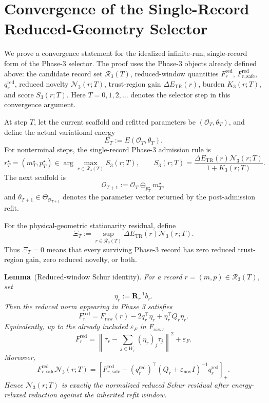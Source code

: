 \documentclass[
  reprint,
  amsmath,
  amssymb,
  aps,
  pra,
  nofootinbib,
  superscriptaddress,
  floatfix
]{revtex4-2}
\newenvironment{schurlemma}[1][]
{\par\medskip\noindent\textbf{Lemma}\if\relax\detokenize{#1}\relax\else\ (#1)\fi.\space\itshape}
{\par\medskip}
\begin{document}
\section{Convergence of the Single-Record Reduced-Geometry Selector}

We prove a convergence statement for the idealized infinite-run,
single-record form of the Phase-3 selector.  The proof uses the Phase-3
objects already defined above: the candidate record set
\(\mathcal R_3(T)\), reduced-window quantities \(F_r^{\mathrm{red}}\),
\(F_{r,\mathrm{safe}}^{\mathrm{red}}\), \(q_r^{\mathrm{red}}\), reduced
novelty \(\mathcal N_3(r;T)\), trust-region gain
\(\Delta E_{\mathrm{TR}}(r)\), burden \(K_3(r;T)\), and score
\(S_3(r;T)\).  Here \(T=0,1,2,\ldots\) denotes the selector step in this
convergence argument.

At step \(T\), let the current scaffold and refitted parameters be
\((\mathcal O_T,\theta_T)\), and define the actual variational energy
\[
E_T:=E(\mathcal O_T,\theta_T).
\]
For nonterminal steps, the single-record Phase-3 admission rule is
\[
r_T^\star=(m_T^\star,p_T^\star)
\in
\arg\max_{r\in\mathcal R_3(T)}S_3(r;T),
\qquad
S_3(r;T)
=
\frac{\Delta E_{\mathrm{TR}}(r)\mathcal N_3(r;T)}
{1+K_3(r;T)}.
\]
The next scaffold is
\[
\mathcal O_{T+1}:=\mathcal O_T\oplus_{p_T^\star}m_T^\star,
\]
and \(\theta_{T+1}\in\Theta_{\mathcal O_{T+1}}\) denotes the parameter
vector returned by the post-admission refit.

For the physical-geometric stationarity residual, define
\[
\Xi_T
:=
\sup_{r\in\mathcal R_3(T)}
\Delta E_{\mathrm{TR}}(r)\mathcal N_3(r;T).
\]
Thus \(\Xi_T=0\) means that every surviving Phase-3 record has zero
reduced trust-region gain, zero reduced novelty, or both.

\begin{schurlemma}[Reduced-window Schur identity]
For a record \(r=(m,p)\in\mathcal R_3(T)\), set
\[
\eta_r:=\mathbf R_r^{-1}b_r.
\]
Then the reduced norm appearing in Phase 3 satisfies
\[
F_r^{\mathrm{red}}
=
F_{\mathrm{raw}}(r)
-2q_r^\top\eta_r
+\eta_r^\top Q_r\eta_r.
\]
Equivalently, up to the already included \(\varepsilon_F\) in
\(F_{\mathrm{raw}}\),
\[
F_r^{\mathrm{red}}
=
\left\|
\tau_r-\sum_{j\in W_r}(\eta_r)_j\tau_j
\right\|^2+\varepsilon_F.
\]
Moreover,
\[
F_{r,\mathrm{safe}}^{\mathrm{red}}\mathcal N_3(r;T)
=
\left[
F_{r,\mathrm{safe}}^{\mathrm{red}}
-
(q_r^{\mathrm{red}})^\top
(Q_r+\varepsilon_{\mathrm{nov}}I)^{-1}
q_r^{\mathrm{red}}
\right]_{+}.
\]
Hence \(\mathcal N_3(r;T)\) is exactly the normalized reduced Schur
residual after energy-relaxed reduction against the inherited refit
window.
\end{schurlemma}
\end{document}

